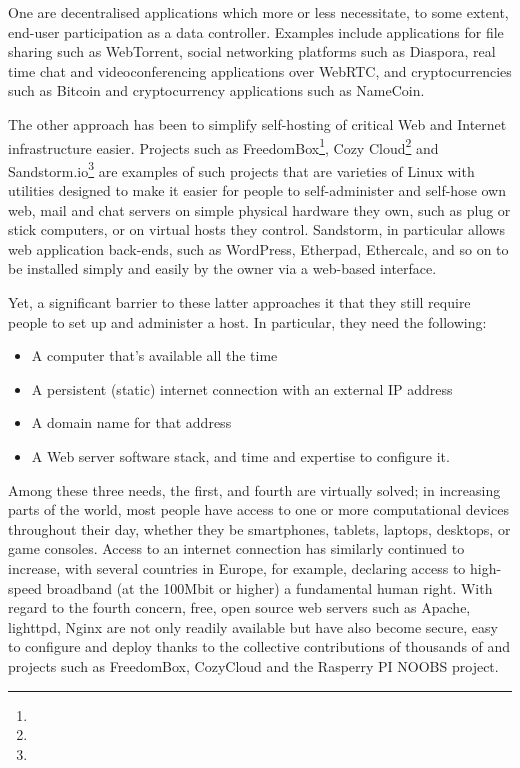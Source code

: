 \documentclass{amsart}
\begin{document}
One are decentralised applications which more or less necessitate, to some extent, end-user participation as a data controller.  Examples include applications for file sharing such as WebTorrent, social networking platforms such as Diaspora, real time chat and videoconferencing applications over WebRTC, and cryptocurrencies such as Bitcoin and cryptocurrency applications such as NameCoin.  

The other approach has been to simplify self-hosting of critical Web and Internet infrastructure easier. Projects such as FreedomBox\footnote{}, Cozy Cloud\footnote{} and Sandstorm.io\footnote{} are examples of such projects that are varieties of Linux with utilities designed to make it easier for people to self-administer and self-hose own web, mail and chat servers on simple physical hardware they own, such as plug or stick computers, or on virtual hosts they control.  Sandstorm, in particular allows web application back-ends, such as WordPress, Etherpad, Ethercalc, and so on to be installed simply and easily by the owner via a web-based interface.  

Yet, a significant barrier to these latter approaches it that they still require people to set up and administer a host. In particular, they need the following:

\begin{itemize}
\item A computer that's available all the time
\item A persistent (static) internet connection with an external IP address
\item A domain name for that address
\item A Web server software stack, and time and expertise to configure it.
\end{itemize}

Among these three needs, the first, and fourth are virtually solved; in increasing parts of the world, most people have access to one or more computational devices throughout their day, whether they be smartphones, tablets, laptops, desktops, or game consoles.  Access to an internet connection has similarly continued to increase, with several countries in Europe, for example, declaring access to high-speed broadband (at the 100Mbit or higher) a fundamental  human right.  With regard to the fourth concern, free, open source web servers such as Apache, lighttpd, Nginx are not only readily available but have also become secure, easy to configure and deploy thanks to the collective contributions of thousands of and projects such as FreedomBox, CozyCloud and the Rasperry PI NOOBS project. 
\end{document}

